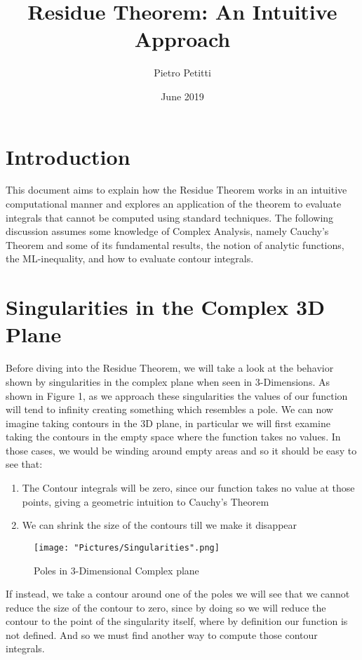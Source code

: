 \documentclass[12pt, letterpaper]{article}
\title{Residue Theorem: An Intuitive Approach }
\author{Pietro Petitti}
\date{June 2019}
\begin{document}
\maketitle

\section*{Introduction}

This document aims to explain how the Residue Theorem works in an intuitive computational manner and explores an application of the theorem to evaluate integrals that cannot be computed using standard techniques. The following discussion assumes some knowledge of Complex Analysis, namely Cauchy's Theorem and some of its fundamental results, the notion of analytic functions, the ML-inequality, and how to evaluate contour integrals.
\bigskip

\section*{Singularities in the Complex 3D Plane}

Before diving into the Residue Theorem, we will take a look at the behavior shown by singularities in the complex plane when seen in 3-Dimensions. As shown in Figure 1, as we approach these singularities the values of our function will tend to infinity creating something which resembles a pole. We can now imagine taking contours in the 3D plane, in particular we will first examine taking the contours in the empty space where the function takes no values. In those cases, we would be winding around empty areas and so it should be easy to see that:

\begin{enumerate}
  \item The Contour integrals will be zero, since our function takes no value at those points, giving a geometric intuition to Cauchy's Theorem
  \item We can shrink the size of the contours till we make it disappear 
\end{enumerate}

\begin{figure}[h]
    \centering
    \texttt{[image: "Pictures/Singularities".png]}
    \caption{Poles in 3-Dimensional Complex plane}
    \label{fig:my_label1}
\end{figure}

\noindent
If instead, we take a contour around one of the poles we will see that we cannot reduce the size of the contour to zero, since by doing so we will reduce the contour to the point of the singularity itself, where by definition our function is not defined. And so we must find another way to compute those contour integrals.
\end{document}
